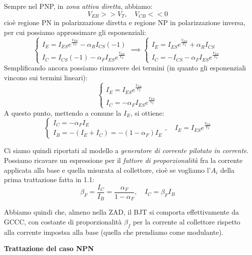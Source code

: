 \documentclass[a4paper,11pt]{article}
\begin{document}
Sempre nel PNP, in \textit{zona attiva diretta}, abbiamo:
$$
V_{EB} >> V_T, \quad V_{CB} << 0
$$
cioè regione PN in polarizzazione diretta e regione NP in polarizzazione inversa, per cui possiamo approssimare gli esponenziali:
$$
\begin{cases}
	I_E = I_{ES} e^{\frac{V_{EB}}{V_T}} - \alpha_R I_{CS} (-1) \\
	I_C = I_{CS} (-1) - \alpha_F I_{ES} e^{\frac{V_{EB}}{V_T}}
\end{cases}
\implies
\begin{cases}
	I_E = I_{ES} e^{\frac{V_{EB}}{V_T}} + \alpha_R I_{CS} \\
	I_C = -I_{CS} - \alpha_F I_{ES} e^{\frac{V_{EB}}{V_T}}
\end{cases}
$$
Semplificando ancora possiamo rimuovere dei termini (in quanto gli esponenziali vincono sui termini lineari):
$$
\begin{cases}
	I_E = I_{ES} e^{\frac{V_{EB}}{V_T}} \\
	I_C = -\alpha_F I_{ES} e^{\frac{V_{EB}}{V_T}}
\end{cases}
$$
A questo punto, mettendo a comune la $I_E$, si ottiene:
$$
\begin{cases}
I_C = - \alpha_F I_E \\
I_B = -(I_E + I_C) = - (1 - \alpha_F) I_E
\end{cases}, \quad
I_E = I_{ES} e^{\frac{V_{EB}}{V_T}}
$$

Ci siamo quindi riportati al modello a \textit{generatore di corrente pilotato in corrente}.  Possiamo ricavare un espressione per il \textit{fattore di proporzionalità} fra la corrente applicata alla base e quella misurata al collettore, cioè se vogliamo l'$A_i$ della prima trattazione fatta in 1.1:
$$
\beta_F = \frac{I_C}{I_B} = \frac{\alpha_F}{1 - \alpha_F}, \quad I_C = \beta_F I_B
$$

Abbiamo quindi che, almeno nella ZAD, il BJT si comporta effettivamente da GCCC, con costante di proporzionalità $\beta_f$ per la corrente al collettore rispetto alla corrente impostsa alla base (quella che prendiamo come modulante). 

\par\smallskip

\noindent
\textbf{\textsf{Trattazione del caso NPN}}
\end{document}
